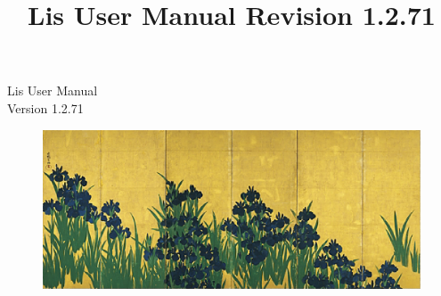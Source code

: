 \documentclass[a4paper]{article}
\title{Lis User Manual Revision 1.2.71}
\author{}
\date{}
\begin{document}
\vspace*{4cm}
\begin{flushleft}
{\Large Lis User Manual}\\
Version 1.2.71
\end{flushleft}

\vspace*{2cm}
\begin{figure}[h]
\includegraphics[scale=0.7]{irises_korin.eps}
\end{figure}
\vspace*{2cm}
\end{document}
